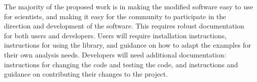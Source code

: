 
The majority of the proposed work is in making the modified software easy to use for scientists, and making it easy for the community to participate in the direction and development of the software.  This requires robust documentation for both users and developers.  Users will require installation instructions, instructions for using the library, and guidance on how to adapt the examples for their own analysis needs.  Developers will need additional documentation: instructions for changing the code and testing the code, and instructions and guidance on contributing their changes to the project.

